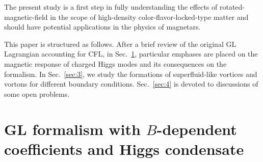\documentclass[12pt]{article}
\begin{document}
The present study is a first step in fully understanding the effects of rotated-magnetic-field in the scope of high-density color-flavor-locked-type matter and should have potential applications in the physics of magnetars.

This paper is structured as follows. After a brief review of the original GL Lagrangian accounting for CFL, in
Sec.~\ref{sec:2}, particular emphases are placed on the magnetic response of charged Higgs modes and its
consequences on the formalism. In Sec.~\ref{sec:3}, we study the formations of superfluid-like vortices and vortons 
for different boundary conditions. Sec.~\ref{sec:4} is devoted to discussions of some open problems.

\section{\bf GL formalism with $B$-dependent coefficients and Higgs condensate }
\label{sec:2}
\vspace{0.2cm}


%
\end{document}
